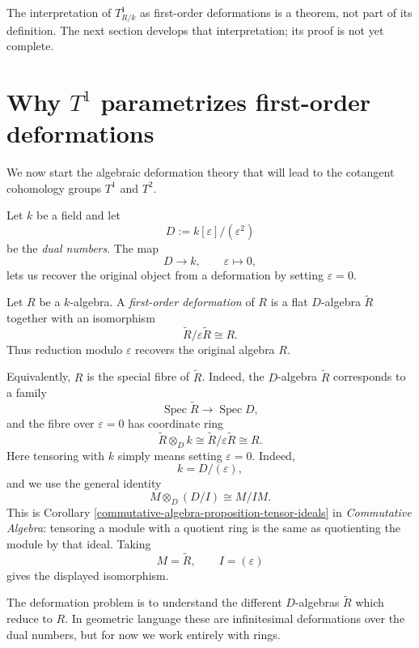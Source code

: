 \medskip\noindent
The interpretation of $T^1_{R/k}$ as
first-order deformations is a theorem,
not part of its definition. The next
section develops that interpretation;
its proof is not yet complete.

\section{Why $T^1$ parametrizes
first-order deformations}
\label{section-first-order-algebra-deformations}

\noindent
We now start the algebraic deformation theory that will lead to the cotangent cohomology groups $T^1$ and $T^2$.

Let $k$ be a field and let
$$
D:=k[\varepsilon]/(\varepsilon^2)
$$
be the \emph{dual numbers}. The map
$$
D\longrightarrow k,
\qquad \varepsilon\longmapsto0,
$$
lets us recover the original object from a deformation by setting $\varepsilon=0$.

\begin{definition}
\label{definition-first-order-deformation-algebra}
Let $R$ be a $k$-algebra. A \emph{first-order deformation} of $R$ is a flat $D$-algebra $\widetilde R$ together with an isomorphism
$$
\widetilde R/\varepsilon\widetilde R\cong R.
$$
Thus reduction modulo $\varepsilon$ recovers the original algebra $R$.
\end{definition}

\noindent
Equivalently, $R$ is the special fibre of $\widetilde R$. Indeed, the $D$-algebra $\widetilde R$ corresponds to a family
$$
\operatorname{Spec}\widetilde R\longrightarrow\operatorname{Spec}D,
$$
and the fibre over $\varepsilon=0$ has coordinate ring
$$
\widetilde R\otimes_D k
\cong\widetilde R/\varepsilon\widetilde R
\cong R.
$$
Here tensoring with $k$ simply means setting
$\varepsilon=0$. Indeed,
$$
k=D/(\varepsilon),
$$
and we use the general identity
$$
M\otimes_D(D/I)\cong M/IM.
$$
This is Corollary
\ref{commutative-algebra-proposition-tensor-ideals} in
\emph{Commutative Algebra}: tensoring a module
with a quotient ring is the same as quotienting
the module by that ideal.
Taking
$$
M=\widetilde R,\qquad I=(\varepsilon)
$$
gives the displayed isomorphism.

\noindent
The deformation problem is to understand the different $D$-algebras $\widetilde R$ which reduce to $R$. In geometric language these are infinitesimal deformations over the dual numbers, but for now we work entirely with rings.

